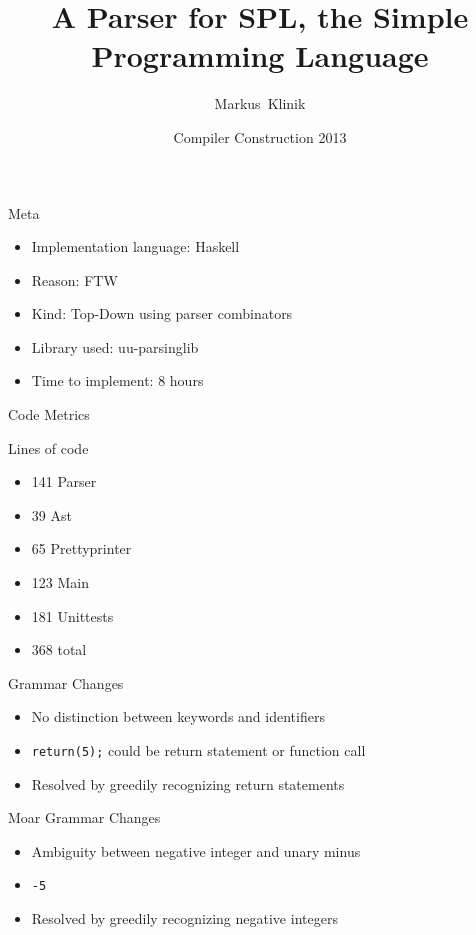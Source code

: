 \documentclass{beamer}
\title
{A Parser for SPL, the Simple Programming Language}
\author
{Markus~Klinik}
\institute[Radboud University Nijmegen] %
{
  Radboud University Nijmegen
}
\date
{Compiler Construction 2013}
\begin{document}
\begin{frame}
  \titlepage
\end{frame}

\begin{frame}{Meta}

  \begin{itemize}
    \item Implementation language: Haskell
    \item Reason: FTW
    \item Kind: Top-Down using parser combinators
    \item Library used: uu-parsinglib
    \item Time to implement: 8 hours
  \end{itemize}

\end{frame}


\begin{frame}{Code Metrics}

  Lines of code

  \begin{itemize}
    \item 141 Parser
    \item 39 Ast
    \item 65 Prettyprinter
    \item 123 Main
    \item 181 Unittests
    \item 368 total
  \end{itemize}

\end{frame}


\begin{frame}{Grammar Changes}

\begin{itemize}
  \item No distinction between keywords and identifiers
  \item \texttt{return(5);} could be return statement or function call
  \item Resolved by greedily recognizing return statements
\end{itemize}

\end{frame}


\begin{frame}{Moar Grammar Changes}

\begin{itemize}
  \item Ambiguity between negative integer and unary minus
  \item \texttt{-5}
  \item Resolved by greedily recognizing negative integers
\end{itemize}

\end{frame}
\end{document}
